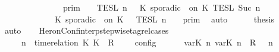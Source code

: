 \begin{isabellebody}
\ \ \ \ \ \ \ \ \ \ \ \ {\isasymunion}\ {\isasymlbrakk}{\isasymlbrakk}\ {\isasymGamma}\ {\isasymrbrakk}{\isasymrbrakk}\isactrlsub p\isactrlsub r\isactrlsub i\isactrlsub m\ {\isasyminter}\ {\isasymlbrakk}{\isasymlbrakk}\ {\isasymPsi}\ {\isasymrbrakk}{\isasymrbrakk}\isactrlsub T\isactrlsub E\isactrlsub S\isactrlsub L\isactrlbsup {\isasymge}\ n\isactrlesup \ {\isasyminter}\ {\isasymlbrakk}\ K\ sporadic\ {\isasymtau}\ on\ K\ {\isasymrbrakk}\isactrlsub T\isactrlsub E\isactrlsub S\isactrlsub L\isactrlbsup {\isasymge}\ Suc\ n\isactrlesup \isanewline
\ \ \ \ \ \ \ \ \ \ \ {\isacharequal}\ {\isasymlbrakk}{\isasymlbrakk}\ {\isacharparenleft}K\ sporadic\ {\isasymtau}\ on\ K\ {\isacharhash}\ {\isasymPsi}\ {\isasymrbrakk}{\isasymrbrakk}\isactrlsub T\isactrlsub E\isactrlsub S\isactrlsub L\isactrlbsup {\isasymge}\ n\isactrlesup \ {\isasyminter}\ {\isasymlbrakk}{\isasymlbrakk}\ {\isasymGamma}\ {\isasymrbrakk}{\isasymrbrakk}\isactrlsub p\isactrlsub r\isactrlsub i\isactrlsub m{\isacartoucheclose}\ \isamarkupfalse%
\ auto\isanewline
\ \ \ \ \isamarkupfalse%
\ {\isacharquery}thesis\ \isamarkupfalse%
\ auto\isanewline
\ \ \isamarkupfalse%
\isanewline
{}\isamarkupfalse%
%
\endisatagproof
{\isafoldproof}%
%
\isadelimproof
\isanewline
%
\endisadelimproof
\isanewline
{}\isamarkupfalse%
\ HeronConf{\isacharunderscore}interp{\isacharunderscore}stepwise{\isacharunderscore}tagrel{\isacharunderscore}cases{\isacharcolon}\isanewline
\ \ \ {\isacartoucheopen}{\isasymlbrakk}\ {\isasymGamma}{\isacharcomma}\ n\ {\isasymturnstile}\ {\isacharparenleft}{\isacharparenleft}time{\isacharminus}relation\ {\isasymlfloor}K\ K\ {\isasymin}\ R{\isacharparenright}\ {\isacharhash}\ {\isasymPsi}{\isacharparenright}\ {\isasymtriangleright}\ {\isasymPhi}\ {\isasymrbrakk}\isactrlsub c\isactrlsub o\isactrlsub n\isactrlsub f\isactrlsub i\isactrlsub g\isanewline
\ \ \ \ {\isacharequal}\ {\isasymlbrakk}\ {\isacharparenleft}{\isacharparenleft}{\isasymlfloor}{\isasymtau}\isactrlsub v\isactrlsub a\isactrlsub r{\isacharparenleft}K\ n{\isacharparenright}{\isacharcomma}\ {\isasymtau}\isactrlsub v\isactrlsub a\isactrlsub r{\isacharparenleft}K\ n{\isacharparenright}{\isasymrfloor}\ {\isasymin}\ R{\isacharparenright}\ {\isacharhash}\ {\isasymGamma}{\isacharparenright}{\isacharcomma}\ n\isanewline

\end{isabellebody}

